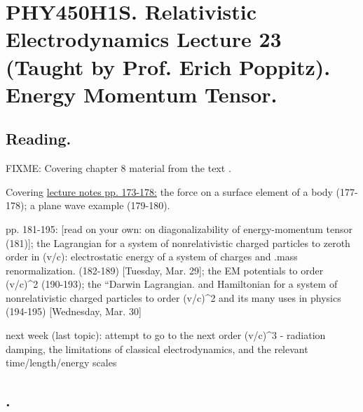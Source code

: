 
%

\chapter{PHY450H1S.  Relativistic Electrodynamics Lecture 23 (Taught by Prof. Erich Poppitz).  Energy Momentum Tensor.}
\label{chap:relativisticElectrodynamicsL23}
{}
\date{Mar 23, 2011}

\beginArtNoToc

\section{Reading.}

FIXME:
Covering chapter 8 material from the text \cite{landau1980classical}.

Covering \href{http://www.physics.utoronto.ca/~poppitz/epoppitz/PHY450_files/RelEMpp166-180.pdf}{lecture notes pp. 173-178:} the force on a surface element of a body (177-178); a plane wave example (179-180).

pp. 181-195: [read on your own: on diagonalizability of energy-momentum tensor (181)]; the Lagrangian for a system of nonrelativistic charged particles to zeroth order in (v/c): electrostatic energy of a system of charges and .mass renormalization. (182-189) [Tuesday, Mar. 29]; the EM potentials to order (v/c)^2 (190-193); the ``Darwin Lagrangian.  and Hamiltonian for a system of nonrelativistic charged particles to order (v/c)^2 and its many uses in physics (194-195) [Wednesday, Mar. 30]

next week (last topic): attempt to go to the next order (v/c)^3 - radiation damping, the limitations of classical electrodynamics, and the relevant time/length/energy scales

\section{.}

\EndArticle
